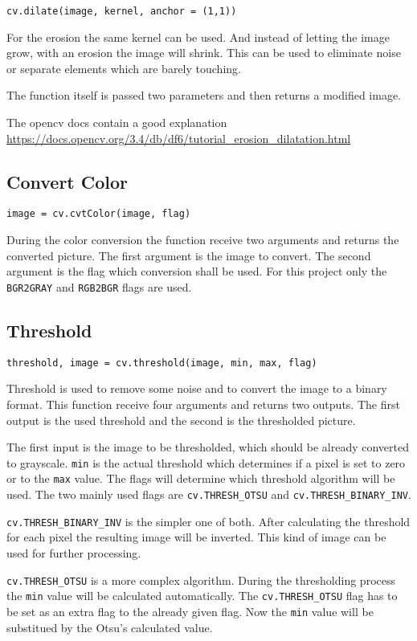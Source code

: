 \texttt{cv.dilate(image, kernel, anchor = (1,1))}

For the erosion the same kernel can be used.
And instead of letting the image grow, with an erosion the image will shrink.
This can be used to eliminate noise or separate elements which are barely touching.

The function itself is passed two parameters and then returns a modified image.

The opencv docs contain a good explanation\\
\url{https://docs.opencv.org/3.4/db/df6/tutorial\_erosion\_dilatation.html}

\subsection{Convert Color}

\texttt{image = cv.cvtColor(image, flag)}

During the color conversion the function receive two arguments and returns the converted picture.
The first argument is the image to convert.
The second argument is the flag which conversion shall be used.
For this project only the \texttt{BGR2GRAY} and \texttt{RGB2BGR} flags are used.

\subsection{Threshold}

\texttt{threshold, image = cv.threshold(image, min, max, flag)}

Threshold is used to remove some noise and to convert the image to a binary format.
This function receive four arguments and returns two outputs.
The first output is the used threshold and the second is the thresholded picture.

The first input is the image to be thresholded, which should be already converted to grayscale.
\texttt{min} is the actual threshold which determines if a pixel is set to zero or to the \texttt{max} value.
The flags will determine which threshold algorithm will be used.
The two mainly used flags are \texttt{cv.THRESH\_OTSU} and \texttt{cv.THRESH\_BINARY\_INV}.

\texttt{cv.THRESH\_BINARY\_INV} is the simpler one of both.
After calculating the threshold for each pixel the resulting image will be inverted.
This kind of image can be used for further processing.

\texttt{cv.THRESH\_OTSU} is a more complex algorithm.
During the thresholding process the \texttt{min} value will be calculated automatically.
The \texttt{cv.THRESH\_OTSU} flag has to be set as an extra flag to the already given flag.
Now the \texttt{min} value will be substitued by the Otsu's calculated value.

